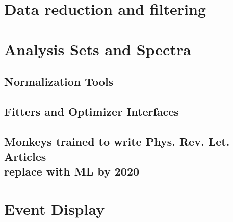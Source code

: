\section{Data reduction and filtering}

\section{Analysis Sets and Spectra}
\subsection{Normalization Tools}
\subsection{Fitters and Optimizer Interfaces}
\subsection{Monkeys trained to write Phys. Rev. Let. Articles\\ replace with ML by 2020}

\section{Event Display}  %

